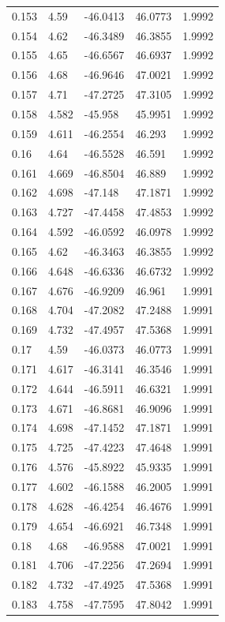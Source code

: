 \begin{tabular}{lllll}
0.153 & 4.59 & -46.0413 & 46.0773 & 1.9992 \\
0.154 & 4.62 & -46.3489 & 46.3855 & 1.9992 \\
0.155 & 4.65 & -46.6567 & 46.6937 & 1.9992 \\
0.156 & 4.68 & -46.9646 & 47.0021 & 1.9992 \\
0.157 & 4.71 & -47.2725 & 47.3105 & 1.9992 \\
0.158 & 4.582 & -45.958 & 45.9951 & 1.9992 \\
0.159 & 4.611 & -46.2554 & 46.293 & 1.9992 \\
0.16 & 4.64 & -46.5528 & 46.591 & 1.9992 \\
0.161 & 4.669 & -46.8504 & 46.889 & 1.9992 \\
0.162 & 4.698 & -47.148 & 47.1871 & 1.9992 \\
0.163 & 4.727 & -47.4458 & 47.4853 & 1.9992 \\
0.164 & 4.592 & -46.0592 & 46.0978 & 1.9992 \\
0.165 & 4.62 & -46.3463 & 46.3855 & 1.9992 \\
0.166 & 4.648 & -46.6336 & 46.6732 & 1.9992 \\
0.167 & 4.676 & -46.9209 & 46.961 & 1.9991 \\
0.168 & 4.704 & -47.2082 & 47.2488 & 1.9991 \\
0.169 & 4.732 & -47.4957 & 47.5368 & 1.9991 \\
0.17 & 4.59 & -46.0373 & 46.0773 & 1.9991 \\
0.171 & 4.617 & -46.3141 & 46.3546 & 1.9991 \\
0.172 & 4.644 & -46.5911 & 46.6321 & 1.9991 \\
0.173 & 4.671 & -46.8681 & 46.9096 & 1.9991 \\
0.174 & 4.698 & -47.1452 & 47.1871 & 1.9991 \\
0.175 & 4.725 & -47.4223 & 47.4648 & 1.9991 \\
0.176 & 4.576 & -45.8922 & 45.9335 & 1.9991 \\
0.177 & 4.602 & -46.1588 & 46.2005 & 1.9991 \\
0.178 & 4.628 & -46.4254 & 46.4676 & 1.9991 \\
0.179 & 4.654 & -46.6921 & 46.7348 & 1.9991 \\
0.18 & 4.68 & -46.9588 & 47.0021 & 1.9991 \\
0.181 & 4.706 & -47.2256 & 47.2694 & 1.9991 \\
0.182 & 4.732 & -47.4925 & 47.5368 & 1.9991 \\
0.183 & 4.758 & -47.7595 & 47.8042 & 1.9991 \\

\end{tabular}

